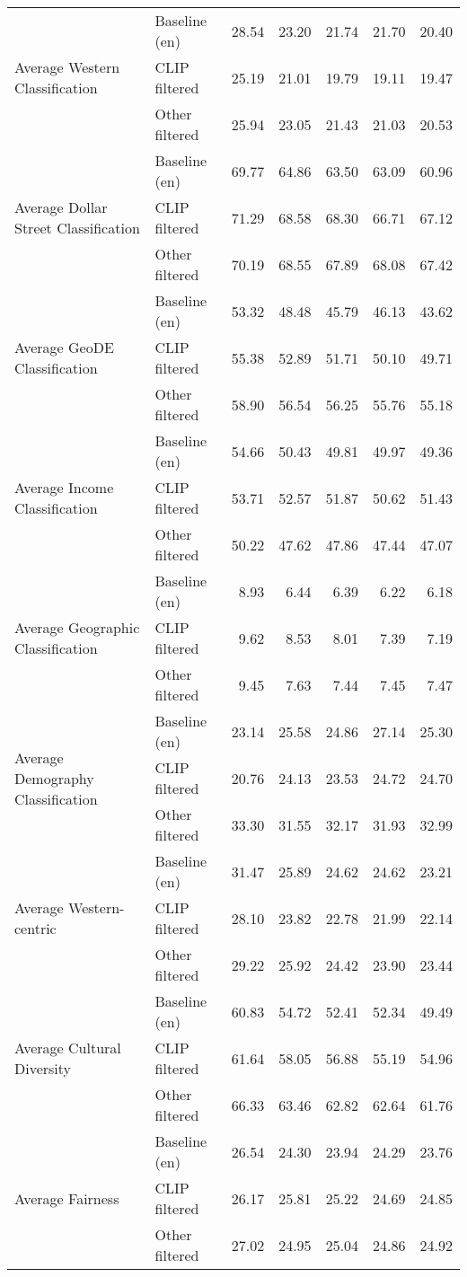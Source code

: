 {\begin{longtable}{l|l|rrrrr}
\midrule
\multirow[t]{3}{*}{Average Western Classification} & Baseline (en) & 28.54 & 23.20 & 21.74 & 21.70 & 20.40 \\
 & CLIP filtered & 25.19 & 21.01 & 19.79 & 19.11 & 19.47 \\
 & Other filtered & 25.94 & 23.05 & 21.43 & 21.03 & 20.53 \\
\midrule
\multirow[t]{3}{*}{Average Dollar Street Classification} & Baseline (en) & 69.77 & 64.86 & 63.50 & 63.09 & 60.96 \\
 & CLIP filtered & 71.29 & 68.58 & 68.30 & 66.71 & 67.12 \\
 & Other filtered & 70.19 & 68.55 & 67.89 & 68.08 & 67.42 \\
\midrule
\multirow[t]{3}{*}{Average GeoDE Classification} & Baseline (en) & 53.32 & 48.48 & 45.79 & 46.13 & 43.62 \\
 & CLIP filtered & 55.38 & 52.89 & 51.71 & 50.10 & 49.71 \\
 & Other filtered & 58.90 & 56.54 & 56.25 & 55.76 & 55.18 \\
\midrule
\multirow[t]{3}{*}{Average Income Classification} & Baseline (en) & 54.66 & 50.43 & 49.81 & 49.97 & 49.36 \\
 & CLIP filtered & 53.71 & 52.57 & 51.87 & 50.62 & 51.43 \\
 & Other filtered & 50.22 & 47.62 & 47.86 & 47.44 & 47.07 \\
\midrule
\multirow[t]{3}{*}{Average Geographic Classification} & Baseline (en) & 8.93 & 6.44 & 6.39 & 6.22 & 6.18 \\
 & CLIP filtered & 9.62 & 8.53 & 8.01 & 7.39 & 7.19 \\
 & Other filtered & 9.45 & 7.63 & 7.44 & 7.45 & 7.47 \\
\midrule
\multirow[t]{3}{*}{Average Demography Classification} & Baseline (en) & 23.14 & 25.58 & 24.86 & 27.14 & 25.30 \\
 & CLIP filtered & 20.76 & 24.13 & 23.53 & 24.72 & 24.70 \\
 & Other filtered & 33.30 & 31.55 & 32.17 & 31.93 & 32.99 \\
\midrule
\multirow[t]{3}{*}{Average Western-centric} & Baseline (en) & 31.47 & 25.89 & 24.62 & 24.62 & 23.21 \\
 & CLIP filtered & 28.10 & 23.82 & 22.78 & 21.99 & 22.14 \\
 & Other filtered & 29.22 & 25.92 & 24.42 & 23.90 & 23.44 \\
\midrule
\multirow[t]{3}{*}{Average Cultural Diversity} & Baseline (en) & 60.83 & 54.72 & 52.41 & 52.34 & 49.49 \\
 & CLIP filtered & 61.64 & 58.05 & 56.88 & 55.19 & 54.96 \\
 & Other filtered & 66.33 & 63.46 & 62.82 & 62.64 & 61.76 \\
\midrule
\multirow[t]{3}{*}{Average Fairness} & Baseline (en) & 26.54 & 24.30 & 23.94 & 24.29 & 23.76 \\
 & CLIP filtered & 26.17 & 25.81 & 25.22 & 24.69 & 24.85 \\
 & Other filtered & 27.02 & 24.95 & 25.04 & 24.86 & 24.92 \\

\end{longtable}
}
